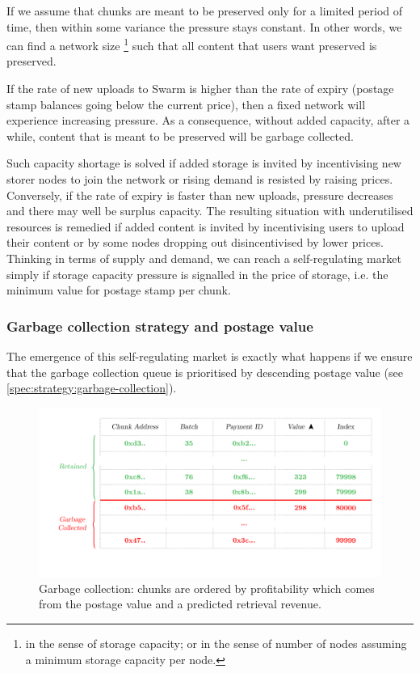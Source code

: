 If we assume that chunks are meant to be preserved only for a limited period of time, then within some variance the pressure stays constant. In other words, we can find a network size%
%
\footnote{in the sense of storage capacity; or in the sense of number of nodes assuming a minimum storage capacity per node.}
%
such that all content that users want preserved is preserved. 

If the rate of new uploads to Swarm is higher than the rate of expiry (postage stamp balances going below the current price), then a fixed network will experience increasing pressure. As a consequence, without added capacity, after a while, content that is meant to be preserved will be garbage collected. 

Such capacity shortage is solved if added storage is invited by incentivising new storer nodes to join the network or rising demand is resisted by raising prices. Conversely, if the rate of expiry is faster than new uploads, pressure decreases and there may well be surplus capacity. The resulting situation with underutilised resources is remedied if added content is invited by incentivising users to upload their content or by some nodes dropping out disincentivised by lower prices. Thinking in terms of supply and demand, we can reach a self-regulating market simply if storage capacity pressure is signalled in the price of storage, i.e. the minimum value for postage stamp per chunk. 

\subsubsection{Garbage collection strategy and postage value}

The emergence of this self-regulating market is exactly what happens if we ensure that the garbage collection queue is prioritised by descending postage value (see \ref{spec:strategy:garbage-collection}).

\begin{figure}[htbp]
  \centering
  \includegraphics[width=\textwidth]{fig/garbage-collection.pdf}
  \caption[Garbage collection \statusgreen]{Garbage collection: chunks are ordered by profitability which comes from the postage value and a predicted retrieval revenue.}
  \label{fig:garbage-collection}
\end{figure}


